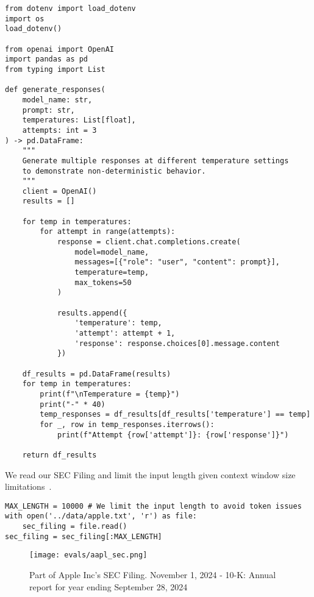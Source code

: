 \begin{verbatim}
from dotenv import load_dotenv
import os
load_dotenv()

from openai import OpenAI
import pandas as pd
from typing import List

def generate_responses(
    model_name: str,
    prompt: str, 
    temperatures: List[float],
    attempts: int = 3
) -> pd.DataFrame:
    """
    Generate multiple responses at different temperature settings
    to demonstrate non-deterministic behavior.
    """
    client = OpenAI()
    results = []
    
    for temp in temperatures:
        for attempt in range(attempts):
            response = client.chat.completions.create(
                model=model_name,
                messages=[{"role": "user", "content": prompt}],
                temperature=temp,
                max_tokens=50
            )
            
            results.append({
                'temperature': temp,
                'attempt': attempt + 1,
                'response': response.choices[0].message.content
            })

    df_results = pd.DataFrame(results)
    for temp in temperatures:
        print(f"\nTemperature = {temp}")
        print("-" * 40)
        temp_responses = df_results[df_results['temperature'] == temp]
        for _, row in temp_responses.iterrows():
            print(f"Attempt {row['attempt']}: {row['response']}")
    
    return df_results
\end{verbatim}

We read our SEC Filing and limit the input length given context window size limitations~.

\begin{verbatim}
MAX_LENGTH = 10000 # We limit the input length to avoid token issues
with open('../data/apple.txt', 'r') as file:
    sec_filing = file.read()
sec_filing = sec_filing[:MAX_LENGTH]
\end{verbatim}

\begin{figure}[h]
\centering
\texttt{[image: evals/aapl\_sec.png]}
\caption{Part of Apple Inc's SEC Filing. November 1, 2024 - 10-K: Annual report for year ending September 28, 2024}
\label{fig:apple-sec-temps}
\end{figure}

